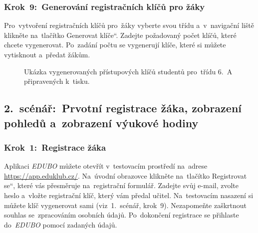 \documentclass[male,czech,api_bc]{kitheses}
\begin{document}
\newpage

\subsubsection{Krok~9:~Generování registračních klíčů pro žáky}
Pro~vytvoření registračních klíčů pro~žáky vyberte svou třídu a~v~navigační liště klikněte na~tlačítko \quotedblbase Generovat klíče``. Zadejte požadovaný počet klíčů, které chcete vygenerovat. Po~zadání počtu se vygenerují klíče, které si můžete vytisknout a~předat žákům.

\begin{figure}[H]
	\centering
	\caption{Ukázka vygenerovaných přístupových klíčů studentů pro~třídu 6.~A připravených k~tisku.}
	\label{fig:manual-5}
\end{figure}

\subsection{2.~scénář:~Prvotní registrace žáka, zobrazení pohledů a~zobrazení výukové hodiny}

\subsubsection{Krok~1:~Registrace žáka}
Aplikaci \textit{EDUBO} můžete otevřít v~testovacím prostředí na~adrese \url{https://app.eduklub.cz/}. Na~úvodní obrazovce klikněte na~tlačítko \quotedblbase Registrovat se``, které vás přesměruje na~registrační formulář. Zadejte svůj e-mail, zvolte heslo a~vložte registrační klíč, který vám předal učitel. Na~testovacím nasazení si můžete klíč vygenerovat sami (viz~1.~scénář, krok~9). Nezapomeňte zaškrtnout souhlas se~zpracováním osobních údajů. Po~dokončení registrace se přihlaste do~\textit{EDUBO} pomocí zadaných údajů.
\end{document}
